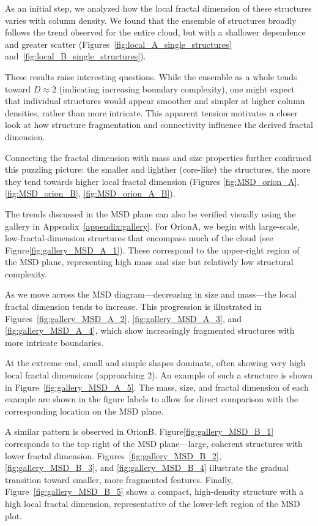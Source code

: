As an initial step, we analyzed how the local fractal dimension of these structures varies with column density.  
We found that the ensemble of structures broadly follows the trend observed for the entire cloud, but with a shallower dependence and greater scatter (Figures~\ref{fig:local_A_single_structures} and~\ref{fig:local_B_single_structures}).  

These results raise interesting questions.  
While the ensemble as a whole tends toward \(D \approx 2\) (indicating increasing boundary complexity), one might expect that individual structures would appear smoother and simpler at higher column densities, rather than more intricate.  
This apparent tension motivates a closer look at how structure fragmentation and connectivity influence the derived fractal dimension.

Connecting the fractal dimension with mass and size properties further confirmed this puzzling picture: the smaller and lighther (core-like) the structures, the more they tend towards higher local fractal dimension (Figures \ref{fig:MSD_orion_A}, \ref{fig:MSD_orion_B}, \ref{fig:MSD_orion_A_B}).

The trends discussed in the MSD plane can also be verified visually using the gallery in Appendix~\ref{appendix:gallery}.
For OrionA, we begin with large-scale, low-fractal-dimension structures that encompass much of the cloud (see Figure\ref{fig:gallery_MSD_A_1}). These correspond to the upper-right region of the MSD plane, representing high mass and size but relatively low structural complexity.

As we move across the MSD diagram—decreasing in size and mass—the local fractal dimension tends to increase.
This progression is illustrated in Figures~\ref{fig:gallery_MSD_A_2}, \ref{fig:gallery_MSD_A_3}, and \ref{fig:gallery_MSD_A_4}, which show increasingly fragmented structures with more intricate boundaries.

At the extreme end, small and simple shapes dominate, often showing very high local fractal dimensions (approaching 2).
An example of such a structure is shown in Figure~\ref{fig:gallery_MSD_A_5}.
The mass, size, and fractal dimension of each example are shown in the figure labels to allow for direct comparison with the corresponding location on the MSD plane.

A similar pattern is observed in OrionB.
Figure\ref{fig:gallery_MSD_B_1} corresponds to the top right of the MSD plane—large, coherent structures with lower fractal dimension.
Figures~\ref{fig:gallery_MSD_B_2}, \ref{fig:gallery_MSD_B_3}, and \ref{fig:gallery_MSD_B_4} illustrate the gradual transition toward smaller, more fragmented features.
Finally, Figure~\ref{fig:gallery_MSD_B_5} shows a compact, high-density structure with a high local fractal dimension, representative of the lower-left region of the MSD plot.

